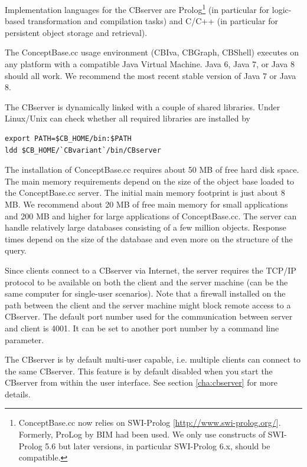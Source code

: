 Implementation languages for the CBserver are Prolog\footnote{ConceptBase.cc now
relies on SWI-Prolog [\url{http://www.swi-prolog.org/}]. Formerly,
ProLog by BIM had been used. We only use constructs of SWI-Prolog 5.6 but
later versions, in particular SWI-Prolog 6.x, should be compatible.}
(in particular for logic-based transformation and compilation
tasks) and C/C++ (in particular for persistent object
storage and retrieval).

The ConceptBase.cc usage environment (CBIva, CBGraph, CBShell) executes on any platform with
a compatible Java Virtual Machine. Java 6, Java 7, or Java 8
should all work. We recommend the most recent stable version of Java 7 or
Java 8.

The CBserver is dynamically linked with a couple of shared
libraries. Under Linux/Unix can check whether all required libraries
are installed by
  
\begin{verbatim}
export PATH=$CB_HOME/bin:$PATH
ldd $CB_HOME/`CBvariant`/bin/CBserver
\end{verbatim}



The installation of ConceptBase.cc requires about 50 MB of free hard disk space. The
main memory requirements depend on the size of the object base
loaded to the ConceptBase.cc server. The initial main memory footprint is just
about 8 MB. We recommend about 20 MB of free main memory for
small applications and 200 MB and higher for large applications
of ConceptBase.cc. The server can handle relatively large databases
consisting of a few million objects.  Response times depend on
the size of the database and even more on the structure of the query.

Since clients connect to a CBserver via Internet, the 
server requires the TCP/IP protocol to be available on both the client and
the server machine (can be the same computer for single-user scenarios).
Note that a firewall installed on the path between the client and
the server machine might block remote access to a CBserver.
The default port number used for the communication between server and
client is 4001. It can be set to another port number by a command line
parameter.

The CBserver is by default multi-user capable, i.e. multiple clients
can connect to the same CBserver. This feature is by default disabled
when you start the CBserver from within the user interface. See
section \ref{cha:cbserver} for more details.

